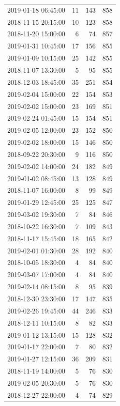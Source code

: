 \begin{tabular}{lrrr}
2019-01-18 06:45:00 & 11 & 143 & 858 \\
2018-11-15 20:15:00 & 10 & 123 & 858 \\
2018-11-20 15:00:00 & 6 & 74 & 857 \\
2019-01-31 10:45:00 & 17 & 156 & 855 \\
2019-01-09 10:15:00 & 25 & 142 & 855 \\
2018-11-07 13:30:00 & 5 & 95 & 855 \\
2018-12-03 18:45:00 & 35 & 251 & 854 \\
2019-02-04 15:00:00 & 22 & 154 & 853 \\
2019-02-02 15:00:00 & 23 & 169 & 851 \\
2019-02-24 01:45:00 & 15 & 154 & 851 \\
2019-02-05 12:00:00 & 23 & 152 & 850 \\
2019-02-02 18:00:00 & 15 & 146 & 850 \\
2018-09-22 20:30:00 & 9 & 116 & 850 \\
2019-02-02 14:00:00 & 24 & 182 & 849 \\
2019-01-02 08:45:00 & 13 & 128 & 849 \\
2018-11-07 16:00:00 & 8 & 99 & 849 \\
2019-01-29 12:45:00 & 25 & 125 & 847 \\
2019-03-02 19:30:00 & 7 & 84 & 846 \\
2018-10-22 16:30:00 & 7 & 109 & 843 \\
2018-11-17 15:45:00 & 18 & 165 & 842 \\
2019-02-01 01:30:00 & 28 & 192 & 840 \\
2018-10-05 18:30:00 & 4 & 84 & 840 \\
2019-03-07 17:00:00 & 4 & 84 & 840 \\
2019-02-14 08:15:00 & 8 & 95 & 839 \\
2018-12-30 23:30:00 & 17 & 147 & 835 \\
2019-02-26 19:45:00 & 44 & 246 & 833 \\
2018-12-11 10:15:00 & 8 & 82 & 833 \\
2019-01-12 13:15:00 & 15 & 128 & 832 \\
2019-01-17 22:00:00 & 7 & 80 & 832 \\
2019-01-27 12:15:00 & 36 & 209 & 831 \\
2018-11-19 14:00:00 & 5 & 76 & 830 \\
2019-02-05 20:30:00 & 5 & 76 & 830 \\
2018-12-27 22:00:00 & 4 & 74 & 829 \\

\end{tabular}
